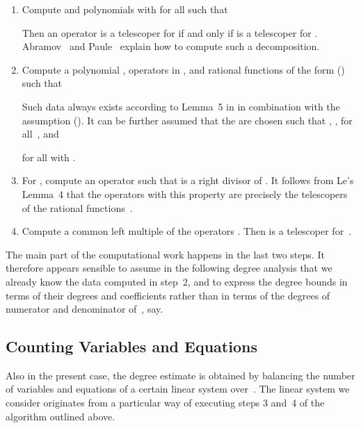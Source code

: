 \documentclass{sig-alternate}
\begin{document}
\begin{enumerate}
\item Compute  and polynomials  with  for all 
  such that
  
  Then an operator  is a telescoper for  if and only if  is a telescoper for .
  Abramov~\cite{abramov95a} and Paule~\cite{paule95} explain how to compute such a decomposition.
\item Compute a polynomial , operators  in , and
  rational functions  of the form  () such that
  
  Such data always exists according to Lemma~5 in \cite{le03} in combination with the assumption 
  (). It can be further assumed that the  are chosen such that , ,
   for all~, and
  
  for all  with .
\item For , compute an operator  such that  is a right divisor
  of . It follows from Le's Lemma~4 that the operators  with this property are precisely
  the telescopers of the rational functions~.
\item Compute a common left multiple  of the operators .
  Then  is a telescoper for~.
\end{enumerate}

The main part of the computational work happens in the last two steps. It
therefore appears sensible to assume in the following degree analysis that we
already know the data  computed in step~2, and
to express the degree bounds in terms of their degrees and coefficients rather
than in terms of the degrees of numerator and denominator of~, say.

\subsection{Counting Variables and Equations}

Also in the present case, the degree estimate is obtained by balancing the number of variables and
equations of a certain linear system over~. The linear system we consider originates from a
particular way of executing steps 3 and~4 of the algorithm outlined above.
\end{document}
